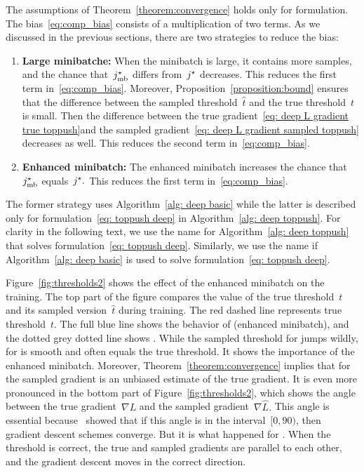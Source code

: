 \pagebreak

The assumptions of Theorem~\ref{theorem:convergence} holds only for \TopPush formulation. The bias~\eqref{eq:comp_bias} consists of a multiplication of two terms. As we discussed in the previous sections, there are two strategies to reduce the bias:
\begin{enumerate}
  \item \textbf{Large minibatche:} When the minibatch is large, it contains more samples, and the chance that~$j^{\star}_{\text{mb}}$ differs from~$j^{\star}$ decreases. This reduces the first term in~\eqref{eq:comp_bias}. Moreover, Proposition~\ref{proposition:bound} ensures that the difference between the sampled threshold~$\hat{t}$ and the true threshold~$t$ is small. Then the difference between the true gradient~\eqref{eq: deep L gradient true toppush}and the sampled gradient~\eqref{eq: deep L gradient sampled toppush} decreases as well. This reduces the second term in~\eqref{eq:comp_bias}.
  \item \textbf{Enhanced minibatch:} The enhanced minibatch increases the chance that~$j^{\star}_{\text{mb}}$ equals~$j^{\star}.$ This reduces the first term in~\eqref{eq:comp_bias}. 
\end{enumerate}
The former strategy uses Algorithm~\ref{alg: deep basic} while the latter is described only for formulation~\eqref{eq: toppush deep} in Algorithm~\ref{alg: deep toppush}. For clarity in the following text, we use the name \DeepTopPush for Algorithm~\ref{alg: deep toppush} that solves formulation~\eqref{eq: toppush deep}. Similarly, we use the name \TopPush if Algorithm~\ref{alg: deep basic} is used to solve formulation~\eqref{eq: toppush deep}.

Figure~\ref{fig:thresholds2} shows the effect of the enhanced minibatch on the training. The top part of the figure compares the value of the true threshold~$t$ and its sampled version~$\hat{t}$ during training. The red dashed line represents true threshold~$t.$ The full blue line shows the behavior of \DeepTopPush (enhanced minibatch), and the dotted grey dotted line shows \TopPush. While the sampled threshold for \TopPush jumps wildly, for \DeepTopPush is smooth and often equals the true threshold. It shows the importance of the enhanced minibatch. Moreover, Theorem~\ref{theorem:convergence} implies that for \DeepTopPush the sampled gradient is an unbiased estimate of the true gradient. It is even more pronounced in the bottom part of Figure~\ref{fig:thresholds2}, which shows the angle between the true gradient~$\nabla L$ and the sampled gradient~$\nabla \hat{L}.$ This angle is essential because~\cite{nocedal2006numerical} showed that if this angle is in the interval~$[0, 90)$, then gradient descent schemes converge. But it is what happened for \DeepTopPush. When the threshold is correct, the true and sampled gradients are parallel to each other, and the gradient descent moves in the correct direction.

